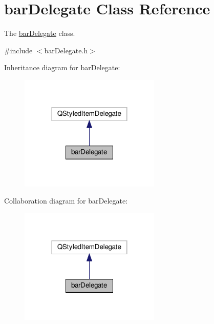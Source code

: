\hypertarget{classbar_delegate}{}\section{bar\+Delegate Class Reference}
\label{classbar_delegate}


The \mbox{\hyperlink{classbar_delegate}{bar\+Delegate}} class.  




{\ttfamily \#include $<$bar\+Delegate.\+h$>$}



Inheritance diagram for bar\+Delegate\+:\nopagebreak
\begin{figure}[H]
\begin{center}
\leavevmode
\includegraphics[width=190pt]{classbar_delegate__inherit__graph}
\end{center}
\end{figure}


Collaboration diagram for bar\+Delegate\+:\nopagebreak
\begin{figure}[H]
\begin{center}
\leavevmode
\includegraphics[width=190pt]{classbar_delegate__coll__graph}
\end{center}
\end{figure}
